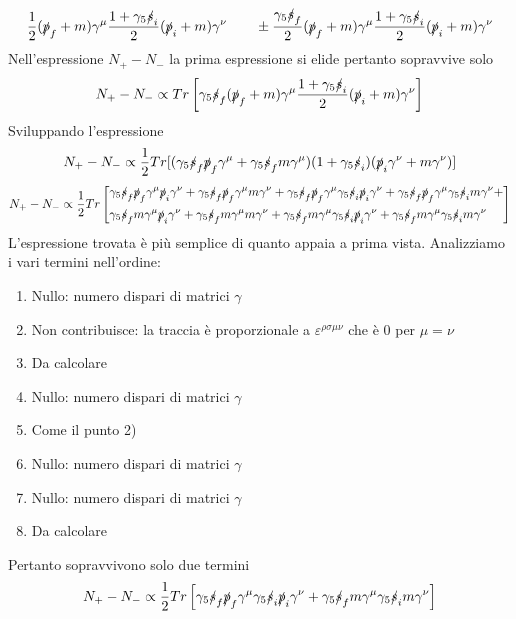 $$
\frac{1}{2}(\slashed{p}_f + m)\gamma^\mu \frac{1 + \gamma_5 \slashed{s}_i}{2} (\slashed{p}_i + m)\gamma^\nu \qquad \pm \frac{\gamma_5 \slashed{s}_f}{2} (\slashed{p}_f + m)\gamma^\mu \frac{1 + \gamma_5 \slashed{s}_i}{2} (\slashed{p}_i + m)\gamma^\nu
$$
Nell'espressione $N_+-N_-$ la prima espressione si elide pertanto sopravvive solo
$$
N_+ - N_- \propto Tr\left[\gamma_5 \slashed{s}_f (\slashed{p}_f + m)\gamma^\mu \frac{1 + \gamma_5 \slashed{s}_i}{2} (\slashed{p}_i + m)\gamma^\nu\right]
$$
Sviluppando l'espressione
$$
N_+ - N_- \propto \frac{1}{2}Tr[(\gamma_5 \slashed{s}_f \slashed{p}_f \gamma^\mu + \gamma_5 \slashed{s}_f m \gamma^\mu)(1 + \gamma_5 \slashed{s}_i)(\slashed{p}_i \gamma^\nu + m\gamma^\nu)]
$$
$$
N_+ - N_- \propto \frac{1}{2}Tr\left[
\begin{aligned}
&\gamma_5 \slashed{s}_f \slashed{p}_f \gamma^\mu \slashed{p}_i \gamma^\nu + \gamma_5 \slashed{s}_f \slashed{p}_f \gamma^\mu m \gamma^\nu + \gamma_5 \slashed{s}_f \slashed{p}_f \gamma^\mu \gamma_5 \slashed{s}_i \slashed{p}_i \gamma^\nu + \gamma_5 \slashed{s}_f \slashed{p}_f \gamma^\mu \gamma_5 \slashed{s}_i m \gamma^\nu + \\
&\gamma_5 \slashed{s}_f m \gamma^\mu \slashed{p}_i \gamma^\nu + \gamma_5 \slashed{s}_f m \gamma^\mu m \gamma^\nu + \gamma_5 \slashed{s}_f m \gamma^\mu \gamma_5 \slashed{s}_i \slashed{p}_i \gamma^\nu + \gamma_5 \slashed{s}_f m \gamma^\mu \gamma_5 \slashed{s}_i m \gamma^\nu
\end{aligned}
\right]
$$
L'espressione trovata è più semplice di quanto appaia a prima vista. Analizziamo i vari termini nell'ordine:
\begin{enumerate}
    \item Nullo: numero dispari di matrici $\gamma$
    \item Non contribuisce: la traccia è proporzionale a $\varepsilon^{\rho\sigma\mu\nu}$ che è $0$ per $\mu=\nu$
    \item Da calcolare
    \item Nullo: numero dispari di matrici $\gamma$
    \item Come il punto 2)
    \item Nullo: numero dispari di matrici $\gamma$
    \item Nullo: numero dispari di matrici $\gamma$
    \item Da calcolare
\end{enumerate}
Pertanto sopravvivono solo due termini
$$
N_+ - N_- \propto \frac{1}{2}Tr\left[ \gamma_5 \slashed{s}_f \slashed{p}_f \gamma^\mu \gamma_5 \slashed{s}_i \slashed{p}_i \gamma^\nu + \gamma_5 \slashed{s}_f m \gamma^\mu \gamma_5 \slashed{s}_i m \gamma^\nu \right]
$$
